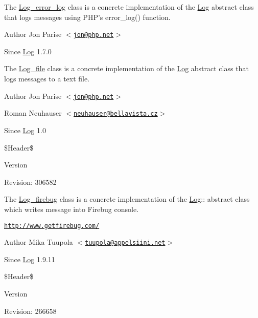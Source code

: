 The \hyperlink{class_log__error__log}{Log\_\-error\_\-log} class is a concrete implementation of the \hyperlink{class_log}{Log} abstract class that logs messages using PHP's error\_\-log() function.

\begin{DoxyAuthor}{Author}
Jon Parise $<$\href{mailto:jon@php.net}{\tt jon@php.net}$>$ 
\end{DoxyAuthor}
\begin{DoxySince}{Since}
\hyperlink{class_log}{Log} 1.7.0
\end{DoxySince}
The \hyperlink{class_log__file}{Log\_\-file} class is a concrete implementation of the \hyperlink{class_log}{Log} abstract class that logs messages to a text file.

\begin{DoxyAuthor}{Author}
Jon Parise $<$\href{mailto:jon@php.net}{\tt jon@php.net}$>$ 

Roman Neuhauser $<$\href{mailto:neuhauser@bellavista.cz}{\tt neuhauser@bellavista.cz}$>$ 
\end{DoxyAuthor}
\begin{DoxySince}{Since}
\hyperlink{class_log}{Log} 1.0
\end{DoxySince}
\$Header\$

\begin{DoxyVersion}{Version}

\end{DoxyVersion}
\begin{DoxyParagraph}{Revision:}
306582 
\end{DoxyParagraph}


The \hyperlink{class_log__firebug}{Log\_\-firebug} class is a concrete implementation of the \hyperlink{class_log}{Log}:: abstract class which writes message into Firebug console.

\href{http://www.getfirebug.com/}{\tt http://www.getfirebug.com/}

\begin{DoxyAuthor}{Author}
Mika Tuupola $<$\href{mailto:tuupola@appelsiini.net}{\tt tuupola@appelsiini.net}$>$ 
\end{DoxyAuthor}
\begin{DoxySince}{Since}
\hyperlink{class_log}{Log} 1.9.11
\end{DoxySince}
\$Header\$

\begin{DoxyVersion}{Version}

\end{DoxyVersion}
\begin{DoxyParagraph}{Revision:}
266658 
\end{DoxyParagraph}


